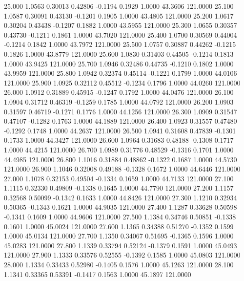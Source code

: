   25.000   1.0563   0.30013   0.42806  -0.1194   0.1929   1.0000  43.3606 121.0000
  25.100   1.0587   0.30091   0.43130  -0.1201   0.1905   1.0000  43.4805 121.0000
  25.200   1.0617   0.30204   0.43438  -0.1207   0.1882   1.0000  43.5955 121.0000
  25.300   1.0655   0.30357   0.43730  -0.1211   0.1861   1.0000  43.7020 121.0000
  25.400   1.0700   0.30569   0.44004  -0.1214   0.1842   1.0000  43.7972 121.0000
  25.500   1.0757   0.30887   0.44262  -0.1215   0.1826   1.0000  43.8779 121.0000
  25.600   1.0830   0.31403   0.44505  -0.1214   0.1813   1.0000  43.9425 121.0000
  25.700   1.0946   0.32486   0.44735  -0.1210   0.1802   1.0000  43.9959 121.0000
  25.800   1.0942   0.32374   0.45114  -0.1221   0.1799   1.0000  44.0106 121.0000
  25.900   1.0925   0.32112   0.45512  -0.1234   0.1796   1.0000  44.0260 121.0000
  26.000   1.0912   0.31889   0.45915  -0.1247   0.1792   1.0000  44.0476 121.0000
  26.100   1.0904   0.31712   0.46319  -0.1259   0.1785   1.0000  44.0792 121.0000
  26.200   1.0903   0.31597   0.46719  -0.1271   0.1776   1.0000  44.1256 121.0000
  26.300   1.0909   0.31547   0.47107  -0.1282   0.1763   1.0000  44.1889 121.0000
  26.400   1.0923   0.31557   0.47480  -0.1292   0.1748   1.0000  44.2637 121.0000
  26.500   1.0941   0.31608   0.47839  -0.1301   0.1733   1.0000  44.3427 121.0000
  26.600   1.0964   0.31683   0.48188  -0.1308   0.1717   1.0000  44.4215 121.0000
  26.700   1.0989   0.31776   0.48529  -0.1316   0.1701   1.0000  44.4985 121.0000
  26.800   1.1016   0.31884   0.48862  -0.1322   0.1687   1.0000  44.5730 121.0000
  26.900   1.1046   0.32008   0.49188  -0.1328   0.1672   1.0000  44.6446 121.0000
  27.000   1.1078   0.32153   0.49504  -0.1334   0.1659   1.0000  44.7133 121.0000
  27.100   1.1115   0.32330   0.49809  -0.1338   0.1645   1.0000  44.7790 121.0000
  27.200   1.1157   0.32568   0.50099  -0.1342   0.1633   1.0000  44.8426 121.0000
  27.300   1.1210   0.32934   0.50365  -0.1343   0.1621   1.0000  44.9035 121.0000
  27.400   1.1287   0.33628   0.50598  -0.1341   0.1609   1.0000  44.9606 121.0000
  27.500   1.1384   0.34746   0.50851  -0.1338   0.1601   1.0000  45.0024 121.0000
  27.600   1.1365   0.34388   0.51270  -0.1352   0.1599   1.0000  45.0134 121.0000
  27.700   1.1350   0.34067   0.51695  -0.1365   0.1596   1.0000  45.0283 121.0000
  27.800   1.1339   0.33794   0.52124  -0.1379   0.1591   1.0000  45.0493 121.0000
  27.900   1.1333   0.33576   0.52555  -0.1392   0.1585   1.0000  45.0803 121.0000
  28.000   1.1334   0.33433   0.52980  -0.1405   0.1576   1.0000  45.1263 121.0000
  28.100   1.1341   0.33365   0.53391  -0.1417   0.1563   1.0000  45.1897 121.0000
